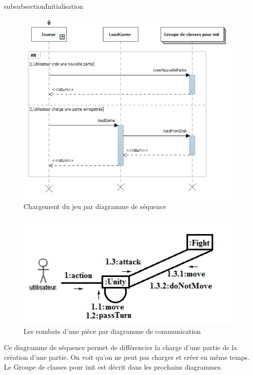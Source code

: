 subsubsection{Initialisation}

\begin{figure}[!h]
\centering
\includegraphics[width=1\textwidth]{img/LoadInitDiagram.png}
\caption{Chargement du jeu par diagramme de séquence}
\end{figure}

\begin{figure}[!h]
\centering
\includegraphics[width=1\textwidth]{img/comm2.png}
\caption{Les combats d'une pièce par diagramme de communication}
\end{figure}

Ce diagramme de séquence permet de différencier la charge d'une partie de la création d'une partie. On voit qu'on ne peut pas charger et créer en même temps. Le Groupe de classes pour init est décrit dans les prochains diagrammes.

